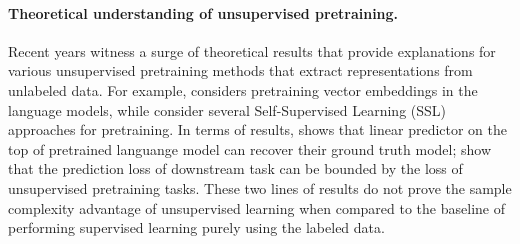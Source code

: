\paragraph{Theoretical understanding of unsupervised pretraining.}
Recent years witness a surge of theoretical results that provide explanations for various unsupervised pretraining methods that extract representations from unlabeled data. For example, \citep{saunshi2020mathematical,wei2021pretrained} considers pretraining vector embeddings in the language models, 
while \citep{arora2019theoretical,tosh2021contrastive2,tosh2021contrastive,haochen2021provable,saunshi2022understanding,lee2021predicting} consider several Self-Supervised Learning (SSL) approaches for pretraining. In terms of results, \citet{wei2021pretrained} shows that linear predictor on the top of pretrained languange model can recover their ground truth model; \citet{arora2019theoretical, saunshi2020mathematical,tosh2021contrastive2,tosh2021contrastive,saunshi2022understanding} show that the prediction loss of downstream task can be bounded by the loss of unsupervised pretraining tasks. These two lines of results do not prove the sample complexity advantage of unsupervised learning when compared to the baseline of performing supervised learning purely using the labeled data.


